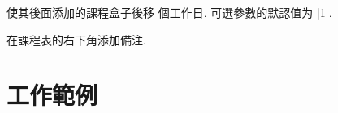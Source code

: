 \documentclass[svgnames]{l3doc}
\begin{document}
\begin{documentation}
\begin{function}{\newday}
  \begin{syntax}
     
  \end{syntax}
  使其後面添加的課程盒子後移  個工作日.
  可選參數的默認值为 |1|.
\end{function}

\begin{function}{\more}
  \begin{syntax}
     
  \end{syntax}
  在課程表的右下角添加備注.
\end{function}

\appendix \linespread{1.25}

\section{工作範例} \label{mwe}





\end{documentation}


\PrintIndex
\end{document}
